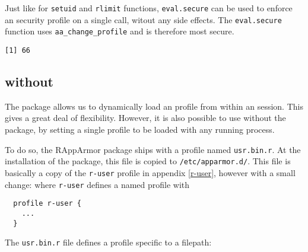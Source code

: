 

Just like for \texttt{setuid} and \texttt{rlimit} functions,
\texttt{eval.secure} can be used to enforce an \AppArmor security profile on a
single call, witout any side effects. The \texttt{eval.secure} function uses
\texttt{aa\_change\_profile} and is therefore most secure.

\begin{knitrout}\mycodesize
{}\color{fgcolor}\begin{kframe}
\begin{alltt}
 \hlkwb{<-} \hlstd{(}\hlstd{(}\hlstd{))}
\end{alltt}
\begin{verbatim}
[1] 66
\end{verbatim}
\begin{alltt}
 \hlkwb{<-} \hlstd{(}\hlstd{(}\hlstd{),}  \hlstd{=} \hlstd{)}
\end{alltt}


\end{kframe}
\end{knitrout}


\subsection{\AppArmor without \RAppArmor}
\label{usr.bin.r}

The \RAppArmor package allows us to dynamically load an \AppArmor profile from
within an \R session. This gives a great deal of flexibility. However, it is
also possible to use \AppArmor without the \RAppArmor package, by setting a
single profile to be loaded with any running \R process.

To do so, the RAppArmor package ships with a profile named \texttt{usr.bin.r}.
At the installation of the package, this file is copied to
\texttt{/etc/apparmor.d/}. This file is basically a copy of the \texttt{r-user}
profile in appendix \ref{r-user}, however with a small change: where
\texttt{r-user} defines a named profile with

\begin{footnotesize}
\begin{verbatim}
  profile r-user {
    ...
  }
\end{verbatim}
\end{footnotesize}
The \texttt{usr.bin.r} file defines a profile specific to a filepath:

